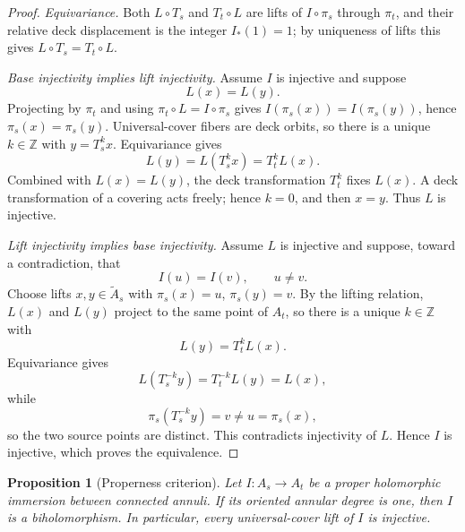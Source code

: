 \documentclass[11pt,reqno]{amsart}
\newtheorem{proposition}[theorem]{Proposition}
\theoremstyle{definition}
\theoremstyle{remark}
\begin{document}
\begin{proof}
\emph{Equivariance.}  Both \(L\circ T_s\) and \(T_t\circ L\) are lifts
of \(I\circ\pi_s\) through \(\pi_t\), and their relative deck
displacement is the integer \(I_*(1)=1\); by uniqueness of lifts this
gives \(L\circ T_s=T_t\circ L\).

\emph{Base injectivity implies lift injectivity.}  Assume \(I\) is
injective and suppose
\[
 L(x)=L(y).
\]
Projecting by \(\pi_t\) and using \(\pi_t\circ L=I\circ\pi_s\) gives
\(I(\pi_s(x))=I(\pi_s(y))\), hence \(\pi_s(x)=\pi_s(y)\).
Universal-cover fibers are deck orbits, so there is a unique
\(k\in\mathbb Z\) with \(y=T_s^{k}x\).  Equivariance gives
\[
 L(y)=L(T_s^{k}x)=T_t^{k}L(x).
\]
Combined with \(L(x)=L(y)\), the deck transformation \(T_t^{k}\) fixes
\(L(x)\).  A deck transformation of a covering acts freely; hence
\(k=0\), and then \(x=y\).  Thus \(L\) is injective.

\emph{Lift injectivity implies base injectivity.}  Assume \(L\) is
injective and suppose, toward a contradiction, that
\[
 I(u)=I(v),\qquad u\ne v .
\]
Choose lifts \(x,y\in\widetilde A_s\) with \(\pi_s(x)=u\),
\(\pi_s(y)=v\).  By the lifting relation, \(L(x)\) and \(L(y)\)
project to the same point of \(A_t\), so there is a unique
\(k\in\mathbb Z\) with
\[
 L(y)=T_t^{k}L(x).
\]
Equivariance gives
\[
 L(T_s^{-k}y)=T_t^{-k}L(y)=L(x),
\]
while
\[
 \pi_s(T_s^{-k}y)=v\ne u=\pi_s(x),
\]
so the two source points are distinct.  This contradicts injectivity
of \(L\).  Hence \(I\) is injective, which proves the equivalence.
\end{proof}
\begin{proposition}[Properness criterion]
\label{prop:properness-biholomorphism}
Let \(I:A_s\to A_t\) be a proper holomorphic immersion between
connected annuli.  If its oriented annular degree is one, then \(I\)
is a biholomorphism.  In particular, every universal-cover lift of
\(I\) is injective.
\end{proposition}
\end{document}
